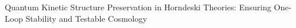 \documentclass[twocolumn]{aastex631}
\begin{document}
Quantum Kinetic Structure Preservation in Horndeski Theories: Ensuring One-Loop Stability and Testable Cosmology
\end{document}
